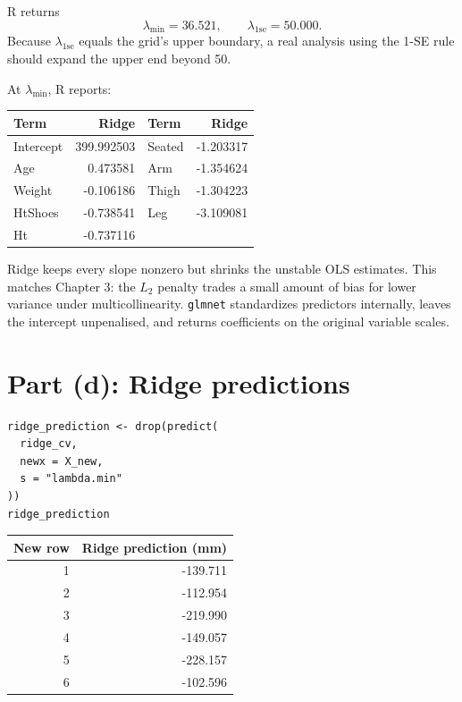 ﻿\documentclass[11pt]{article}
\begin{document}
R returns
\[
\lambda_{\min}=36.521,
\qquad
\lambda_{1\mathrm{se}}=50.000.
\]
Because $\lambda_{1\mathrm{se}}$ equals the grid's upper boundary, a real
analysis using the 1-SE rule should expand the upper end beyond 50.

At $\lambda_{\min}$, R reports:

\begin{center}
\begin{tabular}{lr@{\qquad}lr}
\toprule
\rowcolor{navy!10}\textbf{Term}&\textbf{Ridge}&\textbf{Term}&\textbf{Ridge}\\
\midrule
Intercept&399.992503&Seated&-1.203317\\
Age&0.473581&Arm&-1.354624\\
Weight&-0.106186&Thigh&-1.304223\\
HtShoes&-0.738541&Leg&-3.109081\\
Ht&-0.737116&&\\
\bottomrule
\end{tabular}
\end{center}

Ridge keeps every slope nonzero but shrinks the unstable OLS estimates. This
matches Chapter 3: the $L_2$ penalty trades a small amount of bias for lower
variance under multicollinearity. \texttt{glmnet} standardizes predictors
internally, leaves the intercept unpenalised, and returns coefficients on the
original variable scales.

\section{Part (d): Ridge predictions}

\begin{lstlisting}
ridge_prediction <- drop(predict(
  ridge_cv,
  newx = X_new,
  s = "lambda.min"
))
ridge_prediction
\end{lstlisting}

\begin{center}
\begin{tabular}{rr}
\toprule
\rowcolor{navy!10}\textbf{New row}&\textbf{Ridge prediction (mm)}\\
\midrule
1&-139.711\\
2&-112.954\\
3&-219.990\\
4&-149.057\\
5&-228.157\\
6&-102.596\\
\bottomrule
\end{tabular}
\end{center}
\end{document}

